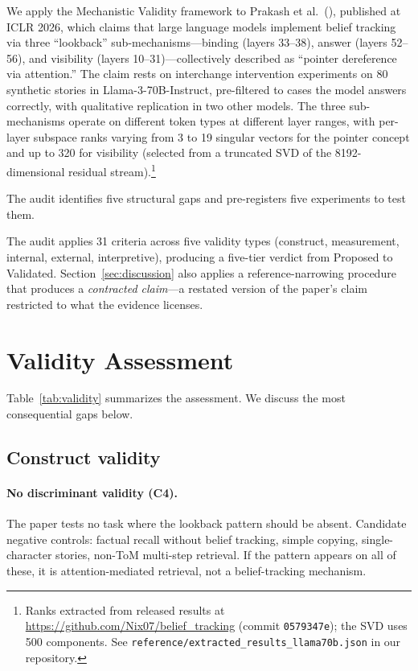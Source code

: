 \documentclass[11pt]{article}
\begin{document}
We apply the Mechanistic Validity framework \citep{tower2026mechval} to Prakash et al.\ (\citeyear{prakash2025lookback}), published at ICLR 2026, which claims that large language models implement belief tracking via three ``lookback'' sub-mechanisms---binding (layers 33--38), answer (layers 52--56), and visibility (layers 10--31)---collectively described as ``pointer dereference via attention.'' The claim rests on interchange intervention experiments on 80 synthetic stories in Llama-3-70B-Instruct, pre-filtered to cases the model answers correctly, with qualitative replication in two other models. The three sub-mechanisms operate on different token types at different layer ranges, with per-layer subspace ranks varying from 3 to 19 singular vectors for the pointer concept and up to 320 for visibility (selected from a truncated SVD of the 8192-dimensional residual stream).\footnote{Ranks extracted from released results at \url{https://github.com/Nix07/belief_tracking} (commit \texttt{0579347e}); the SVD uses 500 components. See \texttt{reference/extracted\_results\_llama70b.json} in our repository.}

The audit identifies five structural gaps and pre-registers five experiments to test them.

The audit applies 31 criteria across five validity types (construct, measurement, internal, external, interpretive), producing a five-tier verdict from Proposed to Validated. Section~\ref{sec:discussion} also applies a reference-narrowing procedure that produces a \emph{contracted claim}---a restated version of the paper's claim restricted to what the evidence licenses.


\section{Validity Assessment}
\label{sec:validity}

Table~\ref{tab:validity} summarizes the assessment. We discuss the most consequential gaps below.

\subsection{Construct validity}

\paragraph{No discriminant validity (C4).}
The paper tests no task where the lookback pattern should be absent. Candidate negative controls: factual recall without belief tracking, simple copying, single-character stories, non-ToM multi-step retrieval. If the pattern appears on all of these, it is attention-mediated retrieval, not a belief-tracking mechanism.
\end{document}
